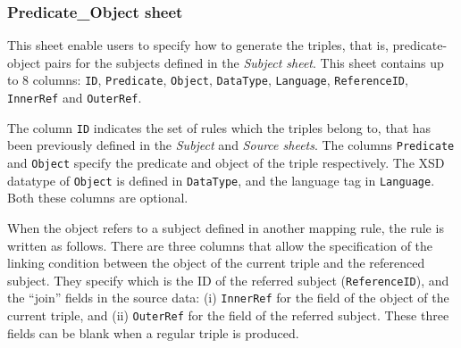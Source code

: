 \subsubsection{Predicate\_Object sheet} 

\begin{table}[h!]
\caption{Predicate\_Object sheet.}
\label{tab:chp5-1_po_sheet}
\centering
{}
\end{table}


This sheet enable users to specify how to generate the triples, that is, predicate-object pairs for the subjects defined in the \textit{Subject sheet}. This sheet contains up to 8 columns: \texttt{ID}, \texttt{Predicate}, \texttt{Object}, \texttt{DataType}, \texttt{Language}, \texttt{ReferenceID}, \texttt{InnerRef} and \texttt{OuterRef}.

The column \texttt{ID} indicates the set of rules which the triples belong to, that has been previously defined in the \textit{Subject} and \textit{Source sheets}.
The columns \texttt{Predicate} and \texttt{Object} specify the predicate and object of the triple respectively. 
The XSD datatype of \texttt{Object} is defined in \texttt{DataType}, and the language tag in \texttt{Language}. Both these columns are optional. 

When the object refers to a subject defined in another mapping rule, the rule is written as follows. 
There are three columns that allow the specification of the linking condition between the object of the current triple and the referenced subject. 
They specify which is the ID of the referred subject  (\texttt{ReferenceID}), and the ``join'' fields in the source data: (i) \texttt{InnerRef} for the field of the object of the current triple, and (ii) \texttt{OuterRef} for the field of the referred subject. These three fields can be blank when a regular triple is produced. 

